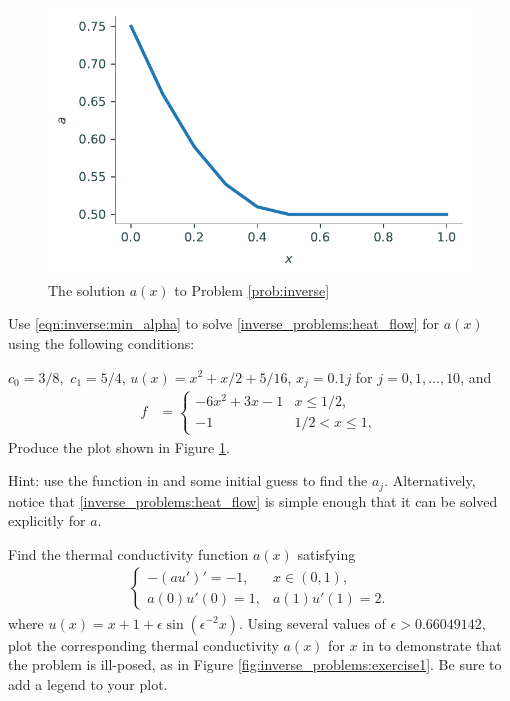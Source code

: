 \begin{figure}[H]
\centering
\includegraphics[width=\textwidth]{figures/density_a.pdf}
\caption{The solution $a(x)$ to Problem \ref{prob:inverse}}
\label{fig:inverse_problems:num1}
\end{figure}

\begin{problem}
Use \eqref{eqn:inverse:min_alpha} to solve \eqref{inverse_problems:heat_flow} for $a(x)$ using the following conditions:

\noindent $c_0 = 3/8,$ $c_1 = 5/4$, $u(x) = x^2 + x/2 + 5/16$, $x_j=0.1j$ for $j=0,1,\dots,10$, and 
\begin{align*}
	f &= \begin{cases}
		-6x^2 + 3x - 1 & x \leq 1/2,\\
		-1 & 1/2 < x \leq 1,
	\end{cases}
\end{align*}
Produce the plot shown in Figure \ref{fig:inverse_problems:num1}.

Hint: use the  function in  and some initial guess to find the $a_j$.
 Alternatively, notice that \ref{inverse_problems:heat_flow} is simple enough that it can be solved explicitly for $a$.
\label{prob:inverse}
\end{problem}

\begin{problem}
	Find the thermal conductivity function $a(x)$ satisfying 
	\begin{align}
	\begin{cases}
		-(au')' = -1, & x \in (0,1),\\
		a(0)u'(0) = 1, & a(1)u'(1) = 2.
	\end{cases} \label{inverse_problems:ill_posed}
	\end{align}
	where $u(x) = x + 1 + \epsilon \sin(\epsilon^{-2}x)$. 
Using several values of $\epsilon  > 0.66049142$, plot the corresponding thermal conductivity $a(x)$ for $x$ in  to demonstrate that the problem is ill-posed, as in Figure \ref{fig:inverse_problems:exercise1}.
Be sure to add a legend to your plot.
\end{problem}

